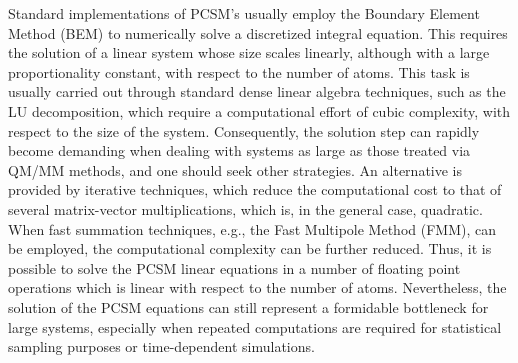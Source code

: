 \documentclass[aip,jcp,a4paper,11pt]{revtex4-1}
\begin{document}
Standard implementations of PCSM's usually employ the Boundary Element Method\cite{MST,ReviewPCM_1994,ReviewPCM_2005,Scalmani_JCP_CSC,York_JPCA_CSC,
Herbert_JCP_ISWIG} (BEM) to numerically solve a discretized integral equation. This requires the solution of a linear system whose size scales linearly, although with a large proportionality constant, with respect to the number of atoms. This task is usually carried out through standard dense linear algebra techniques, such as the LU decomposition\cite{Cammi_JCC_Inversion}, which require a computational effort of cubic complexity, with respect to the size of the system. Consequently, the solution step can rapidly become demanding when dealing with systems as large as those treated via QM/MM methods, and one should seek other strategies. An alternative is provided by iterative techniques, which reduce the computational cost to that of several matrix-vector multiplications\cite{Scalmani_TCA_Iterative}, which is, in  the general case, quadratic. When fast summation techniques, e.g., the Fast Multipole Method (FMM)\cite{FMM}, can be employed, the computational complexity can be further reduced. Thus, it is possible to solve the PCSM linear equations in a number of floating point operations which is linear with respect to the number of atoms. Nevertheless, the solution of the PCSM equations can still represent a formidable bottleneck for large systems\cite{Lipparini_JPCL_ddCOSMO}, especially when repeated computations are required for statistical sampling purposes or time-dependent simulations.
\end{document}
